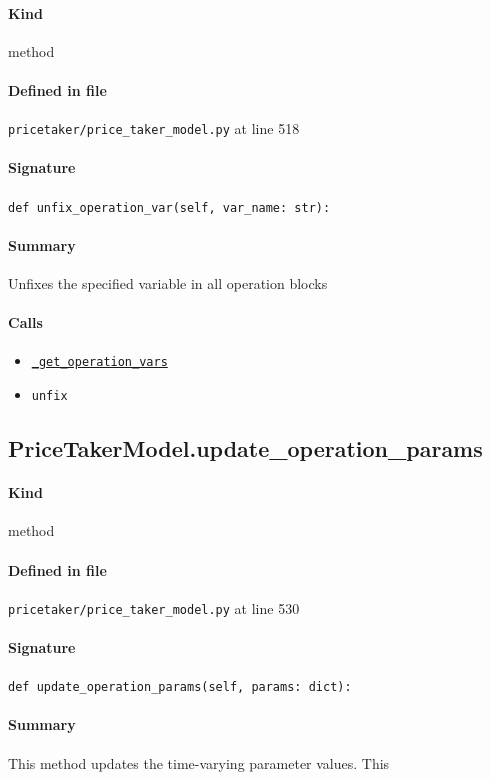 \documentclass[11pt]{report}
\begin{document}
\paragraph{Kind} method
\paragraph{Defined in file} \texttt{pricetaker/price\_taker\_model.py} at line 518
\paragraph{Signature} \texttt{def unfix\_operation\_var(self, var\_name: str):}
\paragraph{Summary} Unfixes the specified variable in all operation blocks
\paragraph{Calls}
\begin{itemize}[leftmargin=*]
  \item \hyperref[def:pricetaker-price_taker_model.py:PriceTakerModel._get_operation_vars:L482]{\texttt{\_get\_operation\_vars}}
  \item \texttt{unfix}
\end{itemize}
\subsection{PriceTakerModel.update\_operation\_params}
\label{def:pricetaker-price_taker_model.py:PriceTakerModel.update_operation_params:L530}
\paragraph{Kind} method
\paragraph{Defined in file} \texttt{pricetaker/price\_taker\_model.py} at line 530
\paragraph{Signature} \texttt{def update\_operation\_params(self, params: dict):}
\paragraph{Summary} This method updates the time-varying parameter values. This
\end{document}
